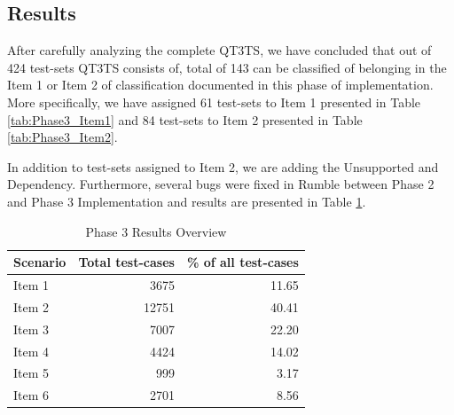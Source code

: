 \subsection{Results}
After carefully analyzing the complete QT3TS, we have concluded that out of 424 test-sets QT3TS consists of, total of 143 can be classified of belonging in the Item 1 or Item 2 of classification documented in this phase of implementation. More specifically, we have assigned 61 test-sets to Item 1 presented in Table \ref{tab:Phase3_Item1} and 84 test-sets to Item 2 presented in Table \ref{tab:Phase3_Item2}.

In addition to test-sets assigned to Item 2, we are adding the Unsupported and Dependency. Furthermore, several bugs were fixed in Rumble between Phase 2 and Phase 3 Implementation and results are presented in Table \ref{tab:Phase3_ResultTable}.
\begin{table}[h!]
	\centering
	\begin{tabular}{|l|r|r|}
		\hline
		\multicolumn{1}{|c|}{Scenario} & \multicolumn{1}{c|}{Total test-cases} & \multicolumn{1}{c|}{\% of all test-cases} \\ \hline
		Item 1                         & 3675                                  & 11.65                                     \\ \hline
		Item 2                         & 12751                                 & 40.41                                     \\ \hline
		Item 3                         & 7007                                  & 22.20                                     \\ \hline
		Item 4                         & 4424                                  & 14.02                                     \\ \hline
		Item 5                         & 999                                   & 3.17                                      \\ \hline
		Item 6                         & 2701                                  & 8.56                                      \\ \hline
	\end{tabular}
	\caption{Phase 3 Results Overview}
	\label{tab:Phase3_ResultTable}
\end{table}


